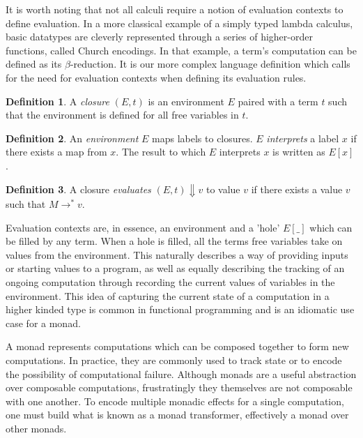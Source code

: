 \documentclass[12pt,a4paper]{report}
\theoremstyle{definition}
\newtheorem{definition}{Definition}[chapter]%
\theoremstyle{remark}
\begin{document}
It is worth noting that not all calculi require a notion of evaluation contexts to define evaluation. In a more classical example of a simply typed lambda calculus, basic datatypes are cleverly represented through a series of higher-order functions, called Church encodings. In that example, a term's computation can be defined as its $\beta$-reduction. It is our more complex language definition which calls for the need for evaluation contexts when defining its evaluation rules.

\begin{definition}
    A \emph{closure} $(E, t)$ is an environment $E$ paired with a term $t$ such that the environment is defined for all free variables in $t$.
\end{definition}

\begin{definition}\label{def: environment}
    An \emph{environment} $E$ maps labels to closures. $E$ \emph{interprets} a label $x$ if there exists a map from $x$. The result to which $E$ interprets $x$ is written as $E[x]$.
\end{definition}

\begin{definition}
    A closure \emph{evaluates} $(E, t) \Downarrow v$ to value $v$ if there exists a value $v$ such that $M \rightarrow^* v$.
\end{definition}

Evaluation contexts are, in essence, an environment and a 'hole' $E[\_]$ which can be filled by any term. When a hole is filled, all the terms free variables take on values from the environment. This naturally describes a way of providing inputs or starting values to a program, as well as equally describing the tracking of an ongoing computation through recording the current values of variables in the environment. This idea of capturing the current state of a computation in a higher kinded type is common in functional programming and is an idiomatic use case for a monad.

A monad represents computations which can be composed together to form new computations. In practice, they are commonly used to track state or to encode the possibility of computational failure. Although monads are a useful abstraction over composable computations, frustratingly they themselves are not composable with one another. To encode multiple monadic effects for a single computation, one must build what is known as a monad transformer, effectively a monad over other monads.
\end{document}
